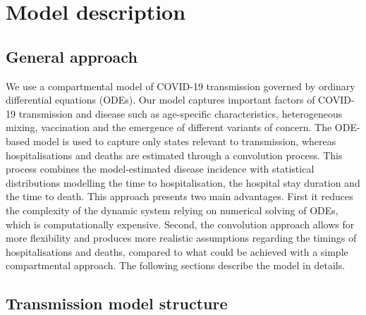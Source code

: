 
\section{Model description}

\subsection{General approach}
We use a compartmental model of COVID-19 transmission governed by ordinary differential equations (ODEs). Our model captures
important factors of COVID-19 transmission and disease such as age-specific characteristics, heterogeneous mixing,
vaccination and the emergence of different variants of concern. The ODE-based model is used to capture only states
relevant to transmission, whereas hospitalisations and deaths are estimated through a convolution process. This process combines
the model-estimated disease incidence with statistical distributions modelling the time to hospitalisation, the hospital stay duration
and the time to death. This approach presents two main advantages. First it reduces the complexity of the dynamic system relying
on numerical solving of ODEs, which is computationally expensive. Second, the convolution approach allows for more flexibility and produces
more realistic assumptions regarding the timings of hospitalisations and deaths, compared to what could be achieved with a simple 
compartmental approach. The following sections describe the model in details.


\subsection{Transmission model structure}

